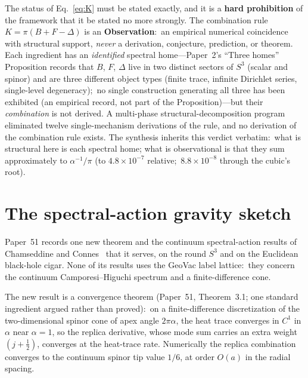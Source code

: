 \documentclass[aps,pra,twocolumn,superscriptaddress,longbibliography]{revtex4-2}
\newcommand{\gvc}[2]{#2}
\begin{document}
The status of Eq.~\eqref{eq:K} must be stated exactly, and it is a
\textbf{hard prohibition} of the framework that it be stated no more
strongly.  \gvc{k-combination-rule}{The combination rule $K=\pi(B+F-\Delta)$ is an
\textbf{Observation}:\ an empirical numerical coincidence with structural
support}, \emph{never} a derivation, conjecture, prediction, or theorem.
Each ingredient has an \emph{identified} spectral home---Paper~2's
``Three homes'' Proposition records that $B$, $F$, $\Delta$ live in two
distinct sectors of $S^3$ (scalar and spinor) and are three different object
types (finite trace, infinite Dirichlet series, single-level degeneracy);\
\gvc{three-homes-negative}{no single construction generating all three has been exhibited (an
empirical record, not part of the Proposition)}---but their \emph{combination} is not derived.  A multi-phase
structural-decomposition program eliminated twelve single-mechanism
derivations of the rule, and no derivation of the combination rule
exists.  The synthesis
inherits this verdict verbatim:\ what is structural here is each spectral
home; \gvc{k-match-precision}{what is observational is that they sum approximately to
$\alpha^{-1}/\pi$ (to $4.8\times10^{-7}$ relative;\ $8.8\times10^{-8}$
through the cubic's root)}.

\section{The spectral-action gravity sketch}\label{sec:gravity}

Paper~51 records one new theorem and the continuum spectral-action
results of Chamseddine and Connes~\cite{chamseddine_connes} that it serves,
on the round $S^3$ and on the Euclidean black-hole cigar.  None of its
results uses the GeoVac label lattice:\ they concern the continuum
Camporesi--Higuchi spectrum and a finite-difference cone.

The new result is a convergence theorem (Paper~51, Theorem~3.1; one
standard ingredient argued rather than proved):\ on a finite-difference
discretization of the two-dimensional spinor cone of apex angle
$2\pi\alpha$, the heat trace converges in $C^1$ in $\alpha$ near $\alpha=1$,
so the replica derivative, whose mode sum carries an extra weight
$(j+\tfrac12)$, converges at the heat-trace rate.  Numerically the replica
combination converges to the continuum spinor tip value $1/6$, at order
$O(a)$ in the radial spacing.
\end{document}
